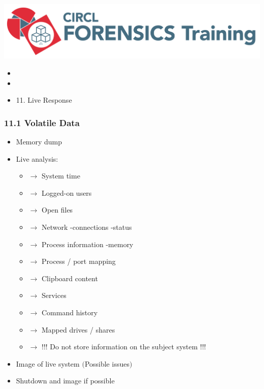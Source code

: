 

\begin{frame}
    \includegraphics[scale=.3]{images/logo-circl-Forensics.png}
    \begin{itemize}
        \item[]
        \item[]
        \item[] 11. Live Response
    \end{itemize}
\end{frame}


\begin{frame}
  \frametitle{11.1 Volatile Data}
  \begin{itemize}
      \item Memory dump
      \item Live analysis:
      \begin{itemize}
          \item[] $\to$ System time
          \item[] $\to$ Logged-on users
          \item[] $\to$ Open files
          \item[] $\to$ Network -connections -status
          \item[] $\to$ Process information -memory
          \item[] $\to$ Process / port mapping
          \item[] $\to$ Clipboard content
          \item[] $\to$ Services
          \item[] $\to$ Command history
          \item[] $\to$ Mapped drives / shares
          \item[] $\to$ !!! Do not store information on the subject system !!!
      \end{itemize}
      \item Image of live system $($Possible issues$)$
      \item Shutdown and image if possible
  \end{itemize}
\end{frame}


